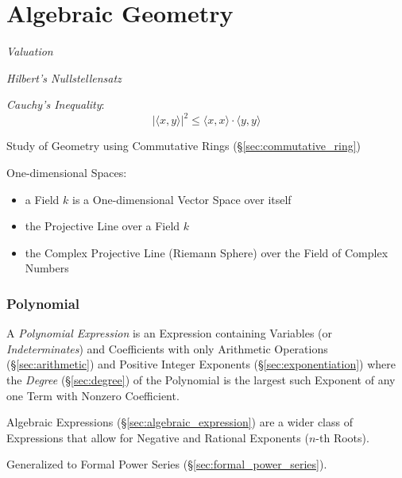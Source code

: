 \part{Algebraic Geometry}\label{part:algebraic_geometry}

\emph{Valuation}

\emph{Hilbert's Nullstellensatz}

\emph{Cauchy's Inequality}:
\[
    |\langle x,y \rangle|^2 \leq \langle x,x \rangle \cdot \langle
    y,y \rangle
\]

Study of Geometry using Commutative Rings
(\S\ref{sec:commutative_ring})

One-dimensional Spaces:

\begin{itemize}
\item a Field $k$ is a One-dimensional Vector Space over itself
\item the Projective Line over a Field $k$
\item the Complex Projective Line (Riemann Sphere) over the Field of Complex
  Numbers
\end{itemize}



\section{Polynomial}\label{sec:polynomial}

A \emph{Polynomial Expression} is an Expression containing Variables (or
\emph{Indeterminates}) and Coefficients with only Arithmetic Operations
(\S\ref{sec:arithmetic}) and Positive Integer Exponents
(\S\ref{sec:exponentiation}) where the \emph{Degree} (\S\ref{sec:degree}) of
the Polynomial is the largest such Exponent of any one Term with Nonzero
Coefficient.

\fist Algebraic Expressions (\S\ref{sec:algebraic_expression}) are a wider
class of Expressions that allow for Negative and Rational Exponents ($n$-th
Roots).

\fist Generalized to Formal Power Series (\S\ref{sec:formal_power_series}).

